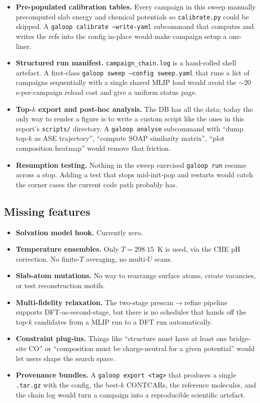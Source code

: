 \documentclass[11pt,a4paper]{article}
\begin{document}
\begin{itemize}
  \item \textbf{Pre-populated calibration tables.} Every campaign
    in this sweep manually precomputed slab energy and chemical
    potentials so \texttt{calibrate.py} could be skipped. A
    \texttt{galoop calibrate --write-yaml} subcommand that
    computes and writes the refs into the config in-place would
    make campaign setup a one-liner.
  \item \textbf{Structured run manifest.} \texttt{campaign\_chain.log}
    is a hand-rolled shell artefact. A first-class
    \texttt{galoop sweep --config sweep.yaml} that runs a list of
    campaigns sequentially with a single shared MLIP load would
    avoid the $\sim$20\,s-per-campaign reload cost and give a
    uniform status page.
  \item \textbf{Top-$k$ export and post-hoc analysis.} The DB
    has all the data; today the only way to render a figure is
    to write a custom script like the ones in this report's
    \texttt{scripts/} directory. A \texttt{galoop analyse} subcommand
    with ``dump top-$k$ as ASE trajectory'', ``compute SOAP
    similarity matrix'', ``plot composition heatmap'' would remove
    that friction.
  \item \textbf{Resumption testing.} Nothing in the sweep
    exercised \texttt{galoop run} resume across a stop. Adding a
    test that stops mid-init-pop and restarts would catch the
    corner cases the current code path probably has.
\end{itemize}

\subsection{Missing features}

\begin{itemize}
  \item \textbf{Solvation model hook.} Currently zero.
  \item \textbf{Temperature ensembles.} Only $T=298.15$~K is used,
    via the CHE pH correction. No finite-$T$ averaging, no multi-$U$
    scans.
  \item \textbf{Slab-atom mutations.} No way to rearrange surface
    atoms, create vacancies, or test reconstruction motifs.
  \item \textbf{Multi-fidelity relaxation.} The two-stage
    prescan$\to$refine pipeline supports DFT-as-second-stage, but
    there is no scheduler that hands off the top-$k$ candidates from
    a MLIP run to a DFT run automatically.
  \item \textbf{Constraint plug-ins.} Things like
    ``structure must have at least one bridge-site CO'' or
    ``composition must be charge-neutral for a given potential''
    would let users shape the search space.
  \item \textbf{Provenance bundles.} A \texttt{galoop export <tag>}
    that produces a single \texttt{.tar.gz} with the config, the
    best-$k$ CONTCARs, the reference molecules, and the chain log
    would turn a campaign into a reproducible scientific artefact.
\end{itemize}
\end{document}
